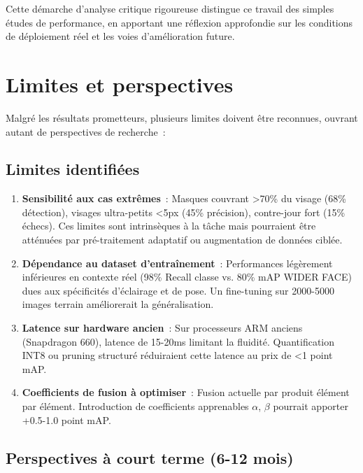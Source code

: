 \begin{onehalfspace}
\hspace{0.65 cm}Cette démarche d'analyse critique rigoureuse distingue ce travail des simples études de performance, en apportant une réflexion approfondie sur les conditions de déploiement réel et les voies d'amélioration future.

\section*{Limites et perspectives}

\hspace{0.65 cm}Malgré les résultats prometteurs, plusieurs limites doivent être reconnues, ouvrant autant de perspectives de recherche~:

\subsection*{Limites identifiées}

\begin{enumerate}
\item \textbf{Sensibilité aux cas extrêmes}~: Masques couvrant >70\% du visage (68\% détection), visages ultra-petits <5px (45\% précision), contre-jour fort (15\% échecs). Ces limites sont intrinsèques à la tâche mais pourraient être atténuées par pré-traitement adaptatif ou augmentation de données ciblée.

\item \textbf{Dépendance au dataset d'entraînement}~: Performances légèrement inférieures en contexte réel (98\% Recall classe vs. 80\% mAP WIDER FACE) dues aux spécificités d'éclairage et de pose. Un fine-tuning sur 2000-5000 images terrain améliorerait la généralisation.

\item \textbf{Latence sur hardware ancien}~: Sur processeurs ARM anciens (Snapdragon 660), latence de 15-20ms limitant la fluidité. Quantification INT8 ou pruning structuré réduiraient cette latence au prix de <1 point mAP.

\item \textbf{Coefficients de fusion à optimiser}~: Fusion actuelle par produit élément par élément. Introduction de coefficients apprenables $\alpha$, $\beta$ pourrait apporter +0.5-1.0 point mAP.
\end{enumerate}

\subsection*{Perspectives à court terme (6-12 mois)}


\end{onehalfspace}
